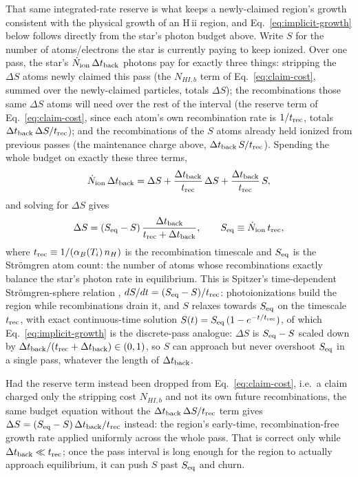 That same integrated-rate reserve is what keeps a newly-claimed
region's growth consistent with the physical growth of an H\,{\sc ii}
region, and Eq.~\ref{eq:implicit-growth} below follows
directly from the star's photon budget above. Write $S$ for the
number of atoms/electrons the star is currently paying to keep
ionized. Over one pass, the star's $\dot N_{\rm ion}\,\Delta t_{\rm
back}$ photons pay for exactly three things: stripping the $\Delta S$
atoms newly claimed this pass (the $N_{HI,b}$ term of
Eq.~\ref{eq:claim-cost}, summed over the newly-claimed particles,
totals $\Delta S$); the recombinations those same $\Delta S$ atoms
will need over the rest of the interval (the reserve term of
Eq.~\ref{eq:claim-cost}, since each atom's own recombination rate is
$1/t_{\rm rec}$, totals $\Delta t_{\rm back}\,\Delta S/t_{\rm rec}$);
and the recombinations of the $S$ atoms already held ionized from
previous passes (the maintenance charge above, $\Delta t_{\rm
back}\,S/t_{\rm rec}$). Spending the whole budget on exactly these
three terms,
\[
  \dot N_{\rm ion}\,\Delta t_{\rm back} =
  \Delta S + \frac{\Delta t_{\rm back}}{t_{\rm rec}}\,\Delta S
  + \frac{\Delta t_{\rm back}}{t_{\rm rec}}\,S,
\]
and solving for $\Delta S$ gives
\begin{equation}
  \Delta S = (S_{\rm eq}-S)\,\frac{\Delta t_{\rm back}}{t_{\rm rec}+\Delta t_{\rm back}},
  \qquad S_{\rm eq} \equiv \dot N_{\rm ion}\,t_{\rm rec},
  \label{eq:implicit-growth}
\end{equation}
where $t_{\rm rec} \equiv 1/(\alpha_B(T_i)\,n_H)$ is the
recombination timescale and $S_{\rm eq}$ is the
Strömgren atom count: the number of atoms whose recombinations exactly
balance the star's photon rate in equilibrium. This is Spitzer's
time-dependent Strömgren-sphere relation \citep{Spitzer1978},
$dS/dt=(S_{\rm eq}-S)/t_{\rm rec}$: photoionizations build the region
while recombinations drain it, and $S$ relaxes towards $S_{\rm eq}$
on the timescale $t_{\rm rec}$, with exact continuous-time solution
$S(t)=S_{\rm eq}\,(1-e^{-t/t_{\rm rec}})$, of which
Eq.~\ref{eq:implicit-growth} is the discrete-pass analogue: $\Delta S$
is $S_{\rm eq}-S$ scaled down by
$\Delta t_{\rm back}/(t_{\rm rec}+\Delta t_{\rm back})\in(0,1)$, so
$S$ can approach but never overshoot $S_{\rm eq}$ in a single pass,
whatever the length of $\Delta t_{\rm back}$.

Had the reserve term instead been dropped from
Eq.~\ref{eq:claim-cost}, i.e.\ a claim charged only the stripping cost
$N_{HI,b}$ and not its own future recombinations, the same budget
equation without the $\Delta t_{\rm back}\,\Delta S/t_{\rm rec}$ term
gives $\Delta S = (S_{\rm eq}-S)\,\Delta t_{\rm back}/t_{\rm rec}$
instead: the region's early-time, recombination-free growth rate
applied uniformly across the whole pass. That is correct only while
$\Delta t_{\rm back}\ll t_{\rm rec}$; once the pass interval is long
enough for the region to actually approach equilibrium, it can push
$S$ past $S_{\rm eq}$ and churn.

